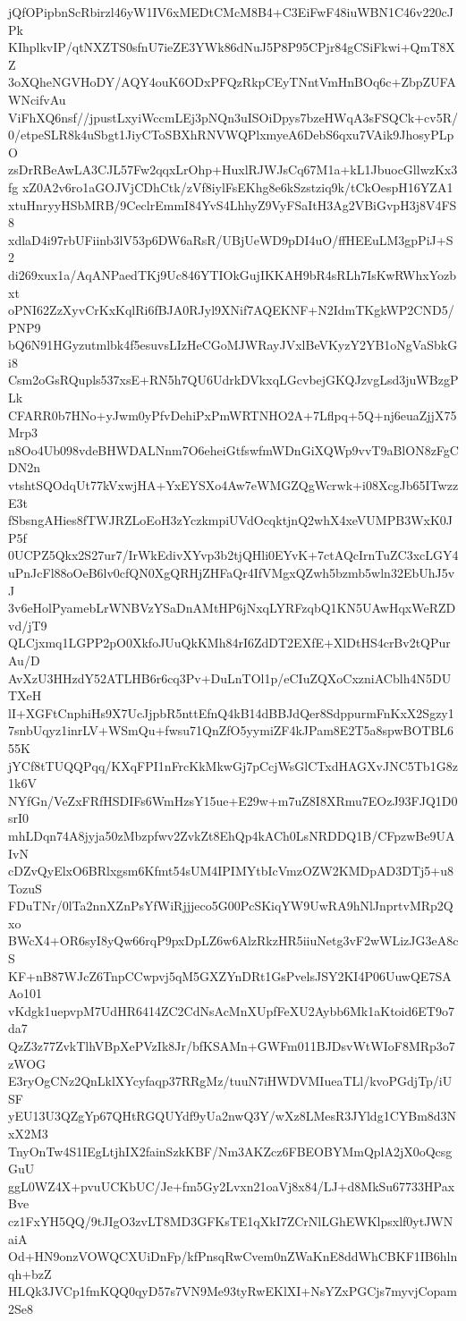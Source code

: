 jQfOPipbnScRbirzl46yW1IV6xMEDtCMcM8B4+C3EiFwF48iuWBN1C46v220cJPk
KIhplkvIP/qtNXZTS0sfnU7ieZE3YWk86dNuJ5P8P95CPjr84gCSiFkwi+QmT8XZ
3oXQheNGVHoDY/AQY4ouK6ODxPFQzRkpCEyTNntVmHnBOq6c+ZbpZUFAWNcifvAu
ViFhXQ6nsf//jpustLxyiWccmLEj3pNQn3uISOiDpys7bzeHWqA3sFSQCk+cv5R/
0/etpeSLR8k4uSbgt1JiyCToSBXhRNVWQPlxmyeA6DebS6qxu7VAik9JhosyPLpO
zsDrRBeAwLA3CJL57Fw2qqxLrOhp+HuxlRJWJsCq67M1a+kL1JbuocGllwzKx3fg
xZ0A2v6ro1aGOJVjCDhCtk/zVf8iylFsEKhg8e6kSzstziq9k/tCkOespH16YZA1
xtuHnryyHSbMRB/9CeclrEmmI84YvS4LhhyZ9VyFSaItH3Ag2VBiGvpH3j8V4FS8
xdlaD4i97rbUFiinb3lV53p6DW6aRsR/UBjUeWD9pDI4uO/ffHEEuLM3gpPiJ+S2
di269xux1a/AqANPaedTKj9Uc846YTIOkGujIKKAH9bR4sRLh7IsKwRWhxYozbxt
oPNI62ZzXyvCrKxKqlRi6fBJA0RJyl9XNif7AQEKNF+N2IdmTKgkWP2CND5/PNP9
bQ6N91HGyzutmlbk4f5esuvsLIzHeCGoMJWRayJVxlBeVKyzY2YB1oNgVaSbkGi8
Csm2oGsRQupls537xsE+RN5h7QU6UdrkDVkxqLGcvbejGKQJzvgLsd3juWBzgPLk
CFARR0b7HNo+yJwm0yPfvDehiPxPmWRTNHO2A+7Lflpq+5Q+nj6euaZjjX75Mrp3
n8Oo4Ub098vdeBHWDALNnm7O6eheiGtfswfmWDnGiXQWp9vvT9aBlON8zFgCDN2n
vtshtSQOdqUt77kVxwjHA+YxEYSXo4Aw7eWMGZQgWcrwk+i08XcgJb65ITwzzE3t
fSbsngAHies8fTWJRZLoEoH3zYczkmpiUVdOcqktjnQ2whX4xeVUMPB3WxK0JP5f
0UCPZ5Qkx2S27ur7/IrWkEdivXYvp3b2tjQHli0EYvK+7ctAQcIrnTuZC3xcLGY4
uPnJcFl88oOeB6lv0cfQN0XgQRHjZHFaQr4IfVMgxQZwh5bzmb5wln32EbUhJ5vJ
3v6eHolPyamebLrWNBVzYSaDnAMtHP6jNxqLYRFzqbQ1KN5UAwHqxWeRZDvd/jT9
QLCjxmq1LGPP2pO0XkfoJUuQkKMh84rI6ZdDT2EXfE+XlDtHS4crBv2tQPurAu/D
AvXzU3HHzdY52ATLHB6r6cq3Pv+DuLnTOl1p/eCIuZQXoCxzniACblh4N5DUTXeH
lI+XGFtCnphiHs9X7UcJjpbR5nttEfnQ4kB14dBBJdQer8SdppurmFnKxX2Sgzy1
7snbUqyz1inrLV+WSmQu+fwsu71QnZfO5yymiZF4kJPam8E2T5a8spwBOTBL655K
jYCf8tTUQQPqq/KXqFPI1nFrcKkMkwGj7pCcjWsGlCTxdHAGXvJNC5Tb1G8z1k6V
NYfGn/VeZxFRfHSDIFs6WmHzsY15ue+E29w+m7uZ8I8XRmu7EOzJ93FJQ1D0srI0
mhLDqn74A8jyja50zMbzpfwv2ZvkZt8EhQp4kACh0LsNRDDQ1B/CFpzwBe9UAIvN
cDZvQyElxO6BRlxgsm6Kfmt54sUM4IPIMYtbIcVmzOZW2KMDpAD3DTj5+u8TozuS
FDuTNr/0lTa2nnXZnPsYfWiRjjjeco5G00PcSKiqYW9UwRA9hNlJnprtvMRp2Qxo
BWcX4+OR6syI8yQw66rqP9pxDpLZ6w6AlzRkzHR5iiuNetg3vF2wWLizJG3eA8cS
KF+nB87WJcZ6TnpCCwpvj5qM5GXZYnDRt1GsPvelsJSY2KI4P06UuwQE7SAAo101
vKdgk1uepvpM7UdHR6414ZC2CdNsAcMnXUpfFeXU2Aybb6Mk1aKtoid6ET9o7da7
QzZ3z77ZvkTlhVBpXePVzIk8Jr/bfKSAMn+GWFm011BJDsvWtWIoF8MRp3o7zWOG
E3ryOgCNz2QnLklXYcyfaqp37RRgMz/tuuN7iHWDVMIueaTLl/kvoPGdjTp/iUSF
yEU13U3QZgYp67QHtRGQUYdf9yUa2nwQ3Y/wXz8LMesR3JYldg1CYBm8d3NxX2M3
TnyOnTw4S1IEgLtjhIX2fainSzkKBF/Nm3AKZcz6FBEOBYMmQplA2jX0oQcsgGuU
ggL0WZ4X+pvuUCKbUC/Je+fm5Gy2Lvxn21oaVj8x84/LJ+d8MkSu67733HPaxBve
cz1FxYH5QQ/9tJIgO3zvLT8MD3GFKsTE1qXkI7ZCrNlLGhEWKlpsxlf0ytJWNaiA
Od+HN9onzVOWQCXUiDnFp/kfPnsqRwCvem0nZWaKnE8ddWhCBKF1IB6hlnqh+bzZ
HLQk3JVCp1fmKQQ0qyD57s7VN9Me93tyRwEKlXI+NsYZxPGCjs7myvjCopam2Se8
